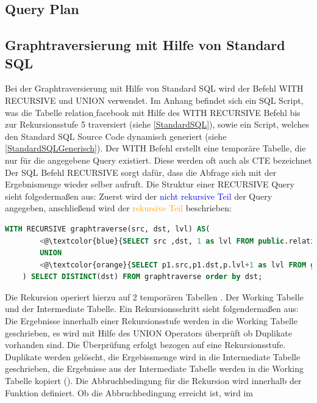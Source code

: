 \subsection{Query Plan}

\subsection{Graphtraversierung mit Hilfe von Standard \ac{SQL}}
\label{postgresStandardSQL}
Bei der Graphtraversierung mit Hilfe von Standard \ac{SQL} wird der Befehl WITH RECURSIVE und UNION verwendet. Im Anhang befindet sich ein SQL
Script, was die Tabelle relation$\_$facebook mit Hilfe des WITH RECURSIVE Befehl bis zur Rekursionsstufe 5 traversiert (siehe \ref{StandardSQL}),
sowie ein Script, welches den Standard SQL Source Code dynamisch generiert (siehe \ref{StandardSQLGenerisch}).
Der WITH Befehl erstellt eine temporäre Tabelle, die nur für die angegebene Query existiert. Diese werden oft auch als \ac{CTE} bezeichnet
Der SQL Befehl RECURSIVE sorgt dafür, dass die Abfrage sich mit der Ergebnismenge wieder selber aufruft. Die Struktur einer RECURSIVE Query sieht folgedermaßen aus:
Zuerst wird der \textcolor{blue}{nicht rekursive Teil} der Query angegeben, anschließend wird der \textcolor{orange}{rekursive Teil} beschrieben:
\begin{lstlisting}[language=SQL,caption = Rekursiver und nicht rekursiver Teil,frame=single, label={StrukturderQuery} ]
    WITH RECURSIVE graphtraverse(src, dst, lvl) AS(
        <@\textcolor{blue}{SELECT src ,dst, 1 as lvl FROM public.relation$\_$facebook WHERE src =765} @>
        UNION
        <@\textcolor{orange}{SELECT p1.src,p1.dst,p.lvl+1 as lvl FROM graphtraverse p, relation$\_$facebook p1 WHERE p1.src IN ( p.dst ) and lvl<5} @>
    ) SELECT DISTINCT(dst) FROM graphtraverse order by dst;
\end{lstlisting}
Die Rekursion operiert hierzu auf 2 temporären Tabellen
. Der Working Tabelle und der Intermediate Tabelle. Ein Rekursionsschritt sieht folgendermaßen aus: Die Ergebnisse innerhalb einer Rekursionsstufe werden in die
Working Tabelle geschrieben, es wird mit Hilfe des UNION Operators überprüft ob Duplikate vorhanden sind. Die Überprüfung erfolgt bezogen auf eine Rekursionsstufe.
Duplikate werden gelöscht, die Ergebissmenge wird in die Intermediate Tabelle geschrieben, die Ergebnisse aus der Intermediate Tabelle werden in die Working Tabelle
kopiert (\cite{postgreswithrecursive}). Die Abbruchbedingung für die Rekursion wird innerhalb der Funktion definiert. Ob die Abbruchbedingung erreicht ist, wird im
